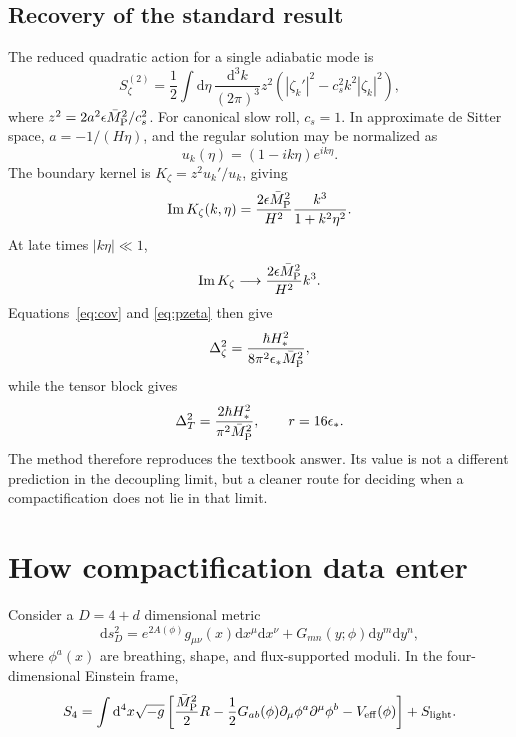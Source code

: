 \documentclass[aps,prd,twocolumn,superscriptaddress,nofootinbib,longbibliography,floatfix]{revtex4-2}
\newcommand{\Mpl}{\bar M_{\rm P}}
\newcommand{\dd}{\mathrm d}
\begin{document}
\subsection{Recovery of the standard result}
The reduced quadratic action for a single adiabatic mode is
\begin{equation}
S_\zeta^{(2)}=\frac12\int\dd\eta\,\frac{\dd^3k}{(2\pi)^3}z^2
\left(|\zeta_k'|^2-c_s^2k^2|\zeta_k|^2\right),
\end{equation}
where $z^2=2a^2\epsilon\Mpl^2/c_s^2$. For canonical slow roll, $c_s=1$. In approximate de Sitter space, $a=-1/(H\eta)$, and the regular solution may be normalized as
\begin{equation}
u_k(\eta)=(1-ik\eta)e^{ik\eta}.
\end{equation}
The boundary kernel is $K_\zeta=z^2u_k'/u_k$, giving
\begin{equation}
\operatorname{Im}K_\zeta(k,\eta)=
\frac{2\epsilon\Mpl^2}{H^2}\frac{k^3}{1+k^2\eta^2}.
\end{equation}
At late times $|k\eta|\ll1$,
\begin{equation}
\operatorname{Im}K_\zeta\longrightarrow
\frac{2\epsilon\Mpl^2}{H^2}k^3.
\end{equation}
Equations~\eqref{eq:cov} and \eqref{eq:pzeta} then give
\begin{equation}
\Delta_\zeta^2=\frac{\hbar H_*^2}{8\pi^2\epsilon_*\Mpl^2},
\end{equation}
while the tensor block gives
\begin{equation}
\Delta_T^2=\frac{2\hbar H_*^2}{\pi^2\Mpl^2},\qquad r=16\epsilon_*.
\end{equation}
The method therefore reproduces the textbook answer. Its value is not a different prediction in the decoupling limit, but a cleaner route for deciding when a compactification does not lie in that limit.

\section{How compactification data enter}
\label{sec:compactification}

Consider a $D=4+d$ dimensional metric
\begin{equation}
\dd s_D^2=e^{2A(\phi)}g_{\mu\nu}(x)\dd x^\mu\dd x^\nu+G_{mn}(y;\phi)\dd y^m\dd y^n,
\end{equation}
where $\phi^a(x)$ are breathing, shape, and flux-supported moduli. In the four-dimensional Einstein frame,
\begin{equation}
S_4=\int\dd^4x\sqrt{-g}\left[\frac{\Mpl^2}{2}R-
\frac12G_{ab}(\phi)\partial_\mu\phi^a\partial^\mu\phi^b-V_{\rm eff}(\phi)\right]+S_{\rm light}.
\label{eq:einstframe}
\end{equation}
\end{document}
